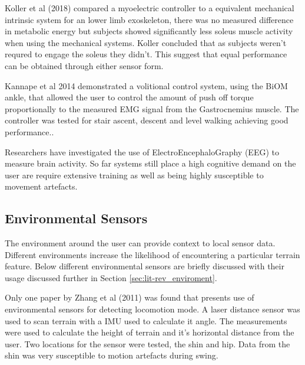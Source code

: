 Koller et al (2018) compared a myoelectric controller to a equivalent mechanical intrinsic system for an lower limb exoskeleton, there was no measured difference in metabolic energy but subjects showed significantly less soleus muscle activity when using the mechanical systems. Koller concluded that as subjects weren't requred to engage the soleus they didn't. This suggest that equal performance can be obtained through either sensor form\cite{Koller2018}.

Kannape et al 2014 demonstrated a volitional control system, using the BiOM ankle, that allowed the user to control the amount of push off torque proportionally to the measured EMG signal from the Gastrocnemius muscle. The controller was tested for stair ascent, descent and level walking achieving good performance.\cite{Kannape2014}.


Researchers have investigated the use of ElectroEncephaloGraphy (EEG) to measure brain activity. So far systems still place a high cognitive demand on the user are require extensive training as well as being highly susceptible to movement artefacts.\cite{Tucker2015}

\subsection{Environmental Sensors}
The environment around the user can provide context to local sensor data. Different environments increase the likelihood of encountering a particular terrain feature.\cite{Tucker2015} Below different environmental sensors are briefly discussed with their usage discussed further in Section \ref{sec:lit-rev_enviroment}.

Only one paper by Zhang et al (2011) was found that presents use of environmental sensors for detecting locomotion mode. A laser distance sensor was used to scan terrain with a IMU used to calculate it angle. The measurements were used to calculate the height of terrain and it's horizontal distance from the user. Two locations for the sensor were tested, the shin and hip. Data from the shin was very susceptible to motion artefacts during swing.\cite{Zhang2011}

